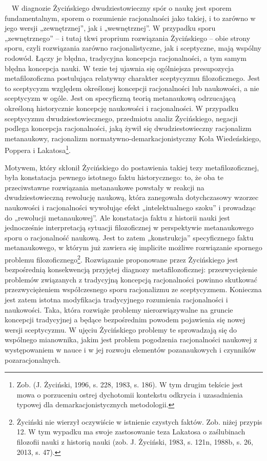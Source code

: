 \documentclass{article}
\begin{document}
\ \ W diagnozie Życińskiego dwudziestowieczny spór o naukę jest sporem fundamentalnym, sporem o rozumienie racjonalności
jako takiej, i to zarówno w jego wersji „zewnętrznej”, jak i „wewnętrznej”. W przypadku sporu „zewnętrznego” – i tutaj
tkwi proprium rozwiązania Życińskiego – obie strony sporu, czyli rozwiązania zarówno racjonalistyczne, jak i
sceptyczne, mają wspólny rodowód. Łączy je błędna, tradycyjna koncepcja racjonalności, a tym samym błędna koncepcja
nauki. W tezie tej ujawnia się ogólniejsza presupozycja metafilozoficzna postulująca relatywny charakter sceptycyzmu
filozoficznego. Jest to sceptycyzm względem określonej koncepcji racjonalności lub naukowości, a nie sceptycyzm w
ogóle. Jest on specyficzną teorią metanaukową odrzucającą określoną historycznie koncepcję naukowości i racjonalności.
W przypadku sceptycyzmu dwudziestowiecznego, przedmiotu analiz Życińskiego, negacji podlega koncepcja racjonalności,
jaką żywił się dwudziestowieczny racjonalizm metanaukowy, racjonalizm normatywno-demarkacjonistyczny Koła Wiedeńskiego,
Poppera i Lakatosa\footnote{Zob. \label{ref:RNDM0IkZEEMNb}(J. Życiński, 1996, s. 228, 1983, s. 186). W tym drugim
tekście jest mowa o porzuceniu ostrej dychotomii kontekstu odkrycia i uzasadnienia typowej dla demarkacjonistycznych
metodologii.}.

Motywem, który skłonił Życińskiego do postawienia takiej tezy metafilozoficznej, była konstatacja pewnego istotnego
faktu historycznego: to, że oba te przeciwstawne rozwiązania metanaukowe powstały w reakcji na dwudziestowieczną
rewolucję naukową, która zanegowała dotychczasowy wzorzec naukowości i racjonalności wywołując efekt „intelektualnego
szoku” i prowadząc do „rewolucji metanaukowej”. Ale konstatacja faktu z historii nauki jest jednocześnie interpretacją
sytuacji filozoficznej w perspektywie metanaukowego sporu o racjonalność naukową. Jest to zatem „konstrukcja”
specyficznego faktu metanaukowego, w którym już zawiera się implicite możliwe rozwiązanie spornego problemu
filozoficznego\footnote{Życiński nie wierzył oczywiście w istnienie czystych faktów. Zob. niżej przypis 12. W tym
wypadku ma swoje zastosowanie teza Lakatosa o zaślubinach filozofii nauki z historią nauki
\label{ref:RNDS7T4vadlBl}(zob. J. Życiński, 1983, s. 121n, 1988b, s. 26, 2013, s. 47).}. Rozwiązanie proponowane przez
Życińskiego jest bezpośrednią konsekwencją przyjętej diagnozy metafilozoficznej: przezwyciężenie problemów związanych z
tradycyjną koncepcją racjonalności powinno skutkować przezwyciężeniem współczesnego sporu racjonalizmu ze sceptycyzmem.
Konieczna jest zatem istotna modyfikacja tradycyjnego rozumienia racjonalności i naukowości. Taka, która rozwiąże
problemy nierozwiązywalne na gruncie koncepcji tradycyjnej a będące bezpośrednim powodem pojawienia się nowej wersji
sceptycyzmu. W ujęciu Życińskiego problemy te sprowadzają się do wspólnego mianownika, jakim jest problem pogodzenia
racjonalności naukowej z występowaniem w nauce i w jej rozwoju elementów pozanaukowych i czynników pozaracjonalnych.
\end{document}
